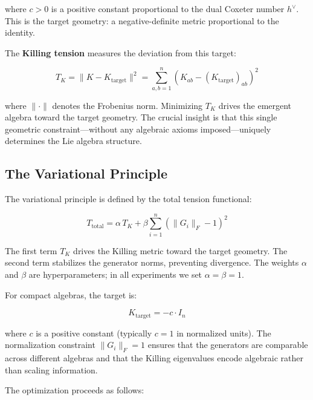 where $c > 0$ is a positive constant proportional to the dual Coxeter number $h^\vee$. This is the target geometry: a negative-definite metric proportional to the identity.

The \textbf{Killing tension} measures the deviation from this target:

\begin{equation}
T_K = \|K - K_{\mathrm{target}}\|^2 = \sum_{a,b=1}^n \left(K_{ab} - (K_{\mathrm{target}})_{ab}\right)^2
\end{equation}

where $\|\cdot\|$ denotes the Frobenius norm. Minimizing $T_K$ drives the emergent algebra toward the target geometry. The crucial insight is that this single geometric constraint---without any algebraic axioms imposed---uniquely determines the Lie algebra structure.

\subsection{The Variational Principle}\label{sec:variational_principle_detail}

The variational principle is defined by the total tension functional:

\begin{equation}
T_{\mathrm{total}} = \alpha\, T_K + \beta \sum_{i=1}^n \left(\|G_i\|_F - 1\right)^2
\end{equation}

The first term $T_K$ drives the Killing metric toward the target geometry. The second term stabilizes the generator norms, preventing divergence. The weights $\alpha$ and $\beta$ are hyperparameters; in all experiments we set $\alpha = \beta = 1$.

For compact algebras, the target is:

\begin{equation}
K_{\mathrm{target}} = -c \cdot I_n
\end{equation}

where $c$ is a positive constant (typically $c = 1$ in normalized units). The normalization constraint $\|G_i\|_F = 1$ ensures that the generators are comparable across different algebras and that the Killing eigenvalues encode algebraic rather than scaling information.

The optimization proceeds as follows:

